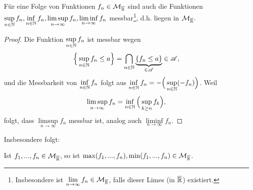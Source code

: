 \begin{lemma}
\begin{mdframed}
Für eine Folge von Funktionen $f_n \in \mathcal{M}_{\overline{\mathbb{R}}}$ sind auch die Funktionen
$
\sup\limits_{n\in\mathbb{N}}f_n, \inf\limits_{n\in\mathbb{N}}f_n, \limsup\limits_{n\to\infty}f_n, \liminf\limits_{n\to\infty}f_n
$
messbar\footnote{Insbesondere ist $\lim\limits_{n\to\infty}f_n\in \mathcal{M}_{\overline{\mathbb{R}}}$, falls dieser Limes (in $\overline{\mathbb{R}}$) existiert.}, d.h. liegen in $\mathcal{M}_{\overline{\mathbb{R}}}$.
\end{mdframed}
\begin{proof} Die Funktion $\sup\limits_{n\in\mathbb{N}} f_n$ ist messbar wegen
$$\Big\{ \sup\limits_{n\in\mathbb{N}}  f_n \leq a \Big\} = \bigcap\limits_{n\in\mathbb{N}} \underbrace{\{f_n \leq a\}}_{\in \mathscr{A}} \in \mathscr{A},$$
und die Messbarkeit von $\inf\limits_{n\in\mathbb{N}} f_n$ folgt aus $\inf\limits_{n\in\mathbb{N}} f_n = - \Big( \sup\limits_{n\in\mathbb{N}} (-f_n) \Big)$. Weil
$$
\limsup_{n\to\infty} f_n=\inf_{n \in \mathbb{N}} \Big(\sup_{k \geq n} f_k\Big),
$$
folgt, dass $\limsup\limits_{n\to\infty} f_n$ messbar ist, analog auch $\liminf\limits_{n\to\infty} f_n$.
\end{proof}
\end{lemma}
Insbesondere folgt:

\begin{korollar}
Ist $f_1,...,f_n \in \mathcal{M}_{\overline{\mathbb{R}}}$, so ist $\max(f_1,...,f_n),\min(f_1,...,f_n)\in \mathcal{M}_{\overline{\mathbb{R}}}$.
\end{korollar}

